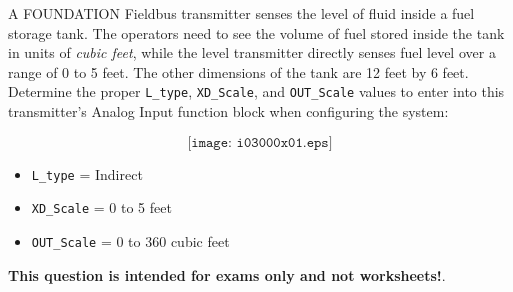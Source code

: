 

A FOUNDATION Fieldbus transmitter senses the level of fluid inside a fuel storage tank.  The operators need to see the volume of fuel stored inside the tank in units of {\it cubic feet}, while the level transmitter directly senses fuel level over a range of 0 to 5 feet.  The other dimensions of the tank are 12 feet by 6 feet.  Determine the proper {\tt L\_type}, {\tt XD\_Scale}, and {\tt OUT\_Scale} values to enter into this transmitter's Analog Input function block when configuring the system:

$$\texttt{[image: i03000x01.eps]}$$







\begin{itemize}
\item{} {\tt L\_type} = Indirect
\item{} {\tt XD\_Scale} = 0 to 5 feet
\item{} {\tt OUT\_Scale} = 0 to 360 cubic feet
\end{itemize}







{\bf This question is intended for exams only and not worksheets!}.



